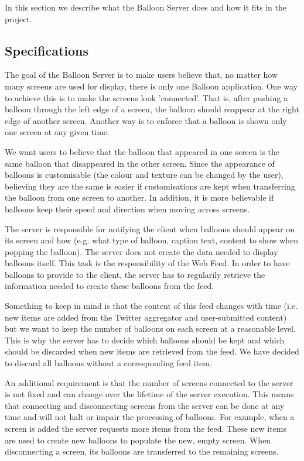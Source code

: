 In this section we describe what the Balloon Server does and how it fits in the
project. 

\subsection{Specifications}

The goal of the Balloon Server is to make users believe that, no matter how
many screens are used for display, there is only one Balloon application. One
way to achieve this is to make the screens look 'connected'. That is, after
pushing a balloon through the left edge of a screen, the balloon should
reappear at the right edge of another screen. Another way is to enforce that a
balloon is shown only one screen at any given time.

We want users to believe that the balloon that appeared in one screen is the
same balloon that disappeared in the other screen. Since the appearance of
balloons is customisable (the colour and texture can be changed by the user),
believing they are the same is easier if customisations are kept when
transferring the balloon from one screen to another. In addition, it is more
believable if balloons keep their speed and direction when moving across 
screens.

The server is responsible for notifying the client when balloons should appear
on its screen and how (e.g. what type of balloon, caption text, content
to show when popping the balloon). The server does not create the data needed to
display balloons itself. This task is the responsibility of the Web Feed. In
order to have balloons to provide to the client, the server has to regularily
retrieve the information needed to create these balloons from the feed.

Something to keep in mind is that the content of this feed changes with time
(i.e. new items are added from the Twitter aggregator and user-submitted 
content) but we want to keep the number of balloons on each screen at a
reasonable level. This is why the server has to decide which balloons should be
kept and which should be discarded when new items are retrieved from the feed.
We have decided to discard all balloons without a corresponding feed item.

An additional requirement is that the number of screens connected to the server
is not fixed and can change over the lifetime of the server execution. This
means that connecting and disconnecting screens from the server can be done at
any time and will not halt or impair the processing of balloons. For example, 
when a screen is added the server requests more items from the feed. These new
items are used to create new balloons to populate the new, empty screen. When 
disconnecting a screen, its balloons are transferred to the remaining screens.

